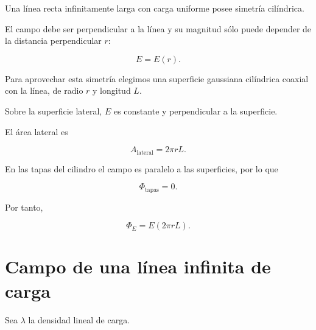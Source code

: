 Una línea recta infinitamente larga con carga uniforme posee simetría cilíndrica.

El campo debe ser perpendicular a la línea y su magnitud sólo puede depender de la
distancia perpendicular \(r\):

\[
E=E(r).
\]

Para aprovechar esta simetría elegimos una superficie gaussiana cilíndrica coaxial
con la línea, de radio \(r\) y longitud \(L\).

\begin{center}
\end{center}

Sobre la superficie lateral, \(E\) es constante y perpendicular a la superficie.

El área lateral es

\[
A_{\text{lateral}}=2\pi rL.
\]

En las tapas del cilindro el campo es paralelo a las superficies, por lo que

\[
\Phi_{\text{tapas}}=0.
\]

Por tanto,

\[
\Phi_E=E(2\pi rL).
\]


\section{Campo de una línea infinita de carga}

Sea \(\lambda\) la densidad lineal de carga.

